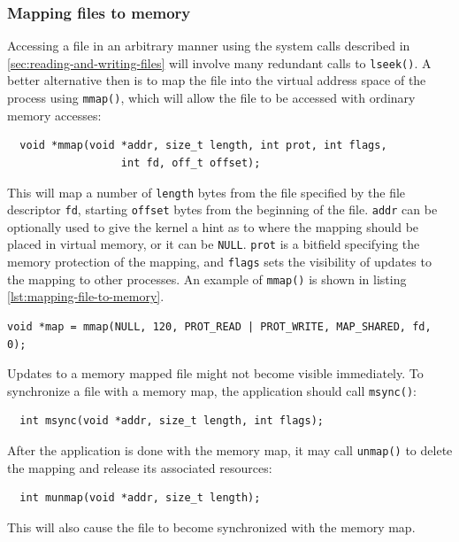 \subsubsection{Mapping files to memory}\label{mapping-files-to-memory}
Accessing a file in an arbitrary manner using the system calls described in \ref{sec:reading-and-writing-files} will involve many redundant calls to \texttt{lseek()}. A better alternative then is to map the file into the virtual address space of the process using \texttt{mmap()}, which will allow the file to be accessed with ordinary memory accesses:
\begin{verbatim}
  void *mmap(void *addr, size_t length, int prot, int flags,
                  int fd, off_t offset);
\end{verbatim}
This will map a number of \texttt{length} bytes from the file specified by the file descriptor \texttt{fd}, starting 
\texttt{offset} bytes from the beginning of the file. \texttt{addr} can be optionally used to give the kernel a hint as to where the mapping should be placed in virtual memory, or it can be \texttt{NULL}. \texttt{prot} is a bitfield specifying the memory protection of the mapping, and \texttt{flags} sets the visibility of updates to the mapping to other processes. An example of \texttt{mmap()} is shown in listing \ref{lst:mapping-file-to-memory}.
\lstset{style=lststyle-c}
\begin{lstlisting}[caption=Mapping the first 120 bytes of a file to memory,label=lst:mapping-file-to-memory]
void *map = mmap(NULL, 120, PROT_READ | PROT_WRITE, MAP_SHARED, fd, 0);
\end{lstlisting}

Updates to a memory mapped file might not become visible immediately. To synchronize a file with a memory map, the application should call \texttt{msync()}:
\begin{verbatim}
  int msync(void *addr, size_t length, int flags);
\end{verbatim}

After the application is done with the memory map, it may call \texttt{unmap()} to delete the mapping and release its associated resources: 
\begin{verbatim}
  int munmap(void *addr, size_t length);
\end{verbatim}
This will also cause the file to become synchronized with the memory map.



